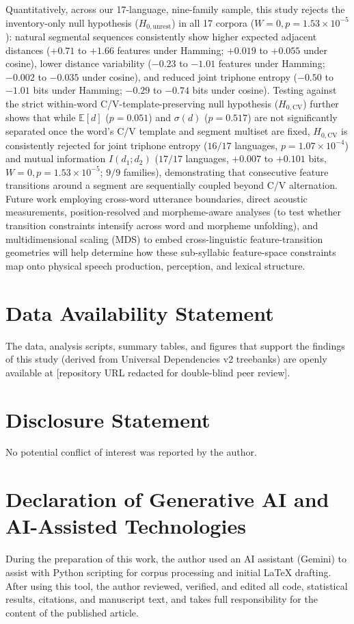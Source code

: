 \documentclass{interact}
\begin{document}
Quantitatively, across our 17-language, nine-family sample, this study rejects the inventory-only null hypothesis ($H_{0,\text{unrest}}$) in all 17 corpora ($W=0, p=1.53 \times 10^{-5}$): natural segmental sequences consistently show higher expected adjacent distances ($+0.71$ to $+1.66$ features under Hamming; $+0.019$ to $+0.055$ under cosine), lower distance variability ($-0.23$ to $-1.01$ features under Hamming; $-0.002$ to $-0.035$ under cosine), and reduced joint triphone entropy ($-0.50$ to $-1.01$ bits under Hamming; $-0.29$ to $-0.74$ bits under cosine). Testing against the strict within-word C/V-template-preserving null hypothesis ($H_{0,\text{CV}}$) further shows that while $\mathbb{E}[d]$ ($p=0.051$) and $\sigma(d)$ ($p=0.517$) are not significantly separated once the word's C/V template and segment multiset are fixed, $H_{0,\text{CV}}$ is consistently rejected for joint triphone entropy ($16/17$ languages, $p=1.07 \times 10^{-4}$) and mutual information $I(d_1; d_2)$ ($17/17$ languages, $+0.007$ to $+0.101$ bits, $W=0, p=1.53 \times 10^{-5}$; $9/9$ families), demonstrating that consecutive feature transitions around a segment are sequentially coupled beyond C/V alternation. Future work employing cross-word utterance boundaries, direct acoustic measurements, position-resolved and morpheme-aware analyses (to test whether transition constraints intensify across word and morpheme unfolding), and multidimensional scaling (MDS) to embed cross-linguistic feature-transition geometries will help determine how these sub-syllabic feature-space constraints map onto physical speech production, perception, and lexical structure.

\section*{Data Availability Statement}
The data, analysis scripts, summary tables, and figures that support the findings of this study (derived from Universal Dependencies v2 treebanks) are openly available at [repository URL redacted for double-blind peer review].

\section*{Disclosure Statement}
No potential conflict of interest was reported by the author.

\section*{Declaration of Generative AI and AI-Assisted Technologies}
During the preparation of this work, the author used an AI assistant (Gemini) to assist with Python scripting for corpus processing and initial LaTeX drafting. After using this tool, the author reviewed, verified, and edited all code, statistical results, citations, and manuscript text, and takes full responsibility for the content of the published article.



\end{document}
